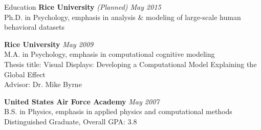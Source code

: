 
\begin{rSection}{Education}
  {\bf Rice University} \hfill {\em (Planned) May 2015} \\
  Ph.D. in Psychology, emphasis in analysis \& modeling of large-scale human behavioral datasets
\item {\bf Rice University} \hfill {\em May 2009} \\ 
  M.A. in Psychology, emphasis in computational cognitive modeling \\
  Thesis title: Visual Displays: Developing a Computational Model Explaining the Global Effect \\
  Advisor: Dr. Mike Byrne
\item {\bf United States Air Force Academy} \hfill {\em May 2007} \\ 
  B.S. in Physics, emphasis in applied physics and computational methods \\
  Distinguished Graduate, Overall GPA: 3.8 \\
\end{rSection}

